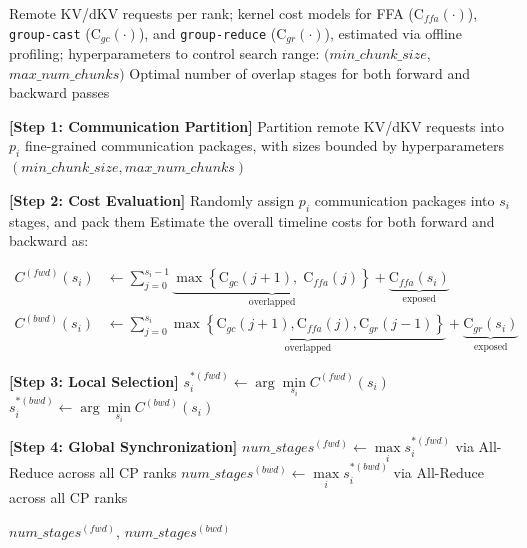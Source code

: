 \begin{algorithm}[htbp]
\caption{Dynamic Overlap Stage Search Algorithm w.r.t.~\ref{sec:magiattn_overlap}}
\label{alg:dynamic-overlap-search}
\begin{algorithmic}[1]
\REQUIRE Remote $\mathrm{KV}$/$\mathrm{dKV}$ requests per rank; kernel cost models for FFA ($\mathrm{C}_{ffa}(\cdot)$), \texttt{group-cast} ($\mathrm{C}_{gc}(\cdot)$), and \texttt{group-reduce} ($\mathrm{C}_{gr}(\cdot)$), estimated via offline profiling;
hyperparameters to control search range: $(min\_chunk\_size$,$max\_num\_chunks)$
\ENSURE Optimal number of overlap stages for both forward and backward passes

    \STATE \textbf{[Step 1: Communication Partition]} Partition remote $\mathrm{KV}$/$\mathrm{dKV}$ requests into $p_i$ fine-grained communication packages, with sizes bounded by hyperparameters\\$(min\_chunk\_size, max\_num\_chunks)$
    
    \STATE \textbf{[Step 2: Cost Evaluation]} 
        \STATE Randomly assign $p_i$ communication packages into $s_i$ stages, and pack them
        \STATE Estimate the overall timeline costs for both forward and backward as:
        
        \begin{align*}
        C^{(fwd)}(s_i) &\gets \sum_{j=0}^{s_i-1} \underbrace{\max \left\{ \mathrm{C}_{gc}(j{+}1),\; \mathrm{C}_{ffa}(j) \right\}}_{\text{overlapped}} + \underbrace{\mathrm{C}_{ffa}(s_i)}_{\text{exposed}} \\
        C^{(bwd)}(s_i) &\gets \sum_{j=0}^{s_i} \underbrace{\max \left\{ \mathrm{C}_{gc}(j{+}1), \mathrm{C}_{ffa}(j), \mathrm{C}_{gr}(j{-}1) \right\}}_{\text{overlapped}} + \underbrace{\mathrm{C}_{gr}(s_i)}_{\text{exposed}}
        \end{align*}
        
    \ENDFOR

    \STATE \textbf{[Step 3: Local Selection]} 
    \STATE $s^{*(fwd)}_i \gets \arg\min\limits_{s_i} C^{(fwd)}(s_i)$ 
    \STATE $s^{*(bwd)}_i \gets \arg\min\limits_{s_i} C^{(bwd)}(s_i)$ 
\ENDFOR

\STATE \textbf{[Step 4: Global Synchronization]} 
\STATE $num\_stages^{(fwd)} \gets \max\limits_{i} s^{*(fwd)}_i$ via All-Reduce across all CP ranks
\STATE $num\_stages^{(bwd)} \gets \max\limits_{i} s^{*(bwd)}_i$ via All-Reduce across all CP ranks

\RETURN $num\_stages^{(fwd)}$, $num\_stages^{(bwd)}$

\end{algorithmic}
\end{algorithm}

























